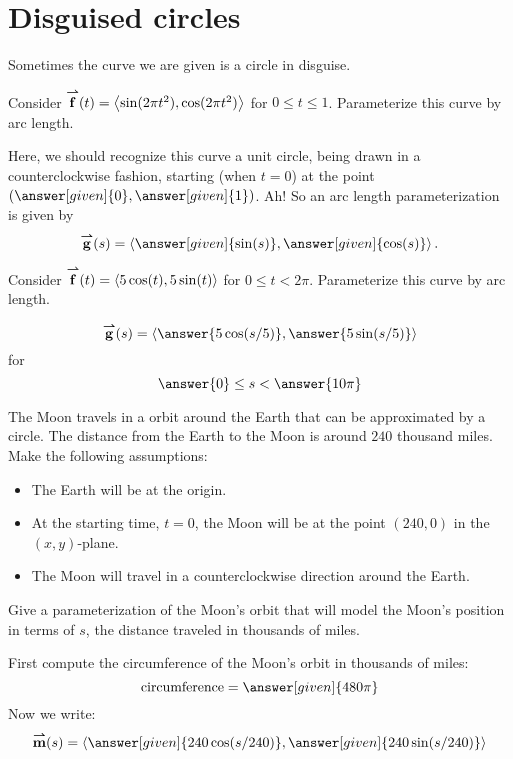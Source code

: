 \documentclass{ximera}
\begin{document}
\section{Disguised circles}

Sometimes the curve we are given is a circle in disguise.

\begin{example}
  Consider ${\overset{\boldsymbol{\rightharpoonup}}{\mathbf{f}}}(t) = \left\langle \sin(2\pi t^2),\cos(2\pi t^2)\right\rangle$ for
  $0\le t\le 1$. Parameterize this curve by arc length.
  \begin{explanation}
    Here, we should recognize this curve a unit circle, being drawn
    in a counterclockwise fashion, starting (when $t=0$) at the
    point $\left(\answer[given]{0},\answer[given]{1}\right)$. Ah! So
    an arc length parameterization is given by
    \[
    \vec{g}(s) = \vector{\answer[given]{\sin(s)},\answer[given]{\cos(s)}}.
    \]
  \end{explanation}
\end{example}


\begin{question}
  Consider ${\overset{\boldsymbol{\rightharpoonup}}{\mathbf{f}}}(t) = \left\langle 5\cos(t),5\sin(t)\right\rangle$ for $0\le t<
  2\pi$. Parameterize this curve by arc length.
  \begin{prompt}
    \[
    \vec{g}(s) = \vector{\answer{5\cos(s/5)},\answer{5\sin(s/5)}}
    \]
    for
    \[
    \answer{0}\le s < \answer{10\pi}
    \]
  \end{prompt}
\end{question}

\begin{example}
  The Moon travels in a orbit around the Earth that can be
  approximated by a circle. The distance from the Earth to the Moon is
  around $240$ thousand miles. Make the following assumptions:
  \begin{itemize}
  \item The Earth will be at the origin.
  \item At the starting time, $t=0$, the Moon will be at the point
    $(240,0)$ in the $(x,y)$-plane.
  \item The Moon will travel in a counterclockwise direction around
    the Earth.
  \end{itemize}
  Give a parameterization of the Moon's orbit that will model the
  Moon's position in terms of $s$, the distance traveled in thousands
  of miles.
  \begin{explanation}
    First compute the circumference of the Moon's orbit in thousands
    of miles:
    \[
    \text{circumference} = \answer[given]{480\pi}
    \]
    Now we write:
    \[
    \vec{m}(s) = \vector{\answer[given]{240\cos(s/240)},\answer[given]{240\sin(s/240)}}
    \]
  \end{explanation}
\end{example}
\end{document}
